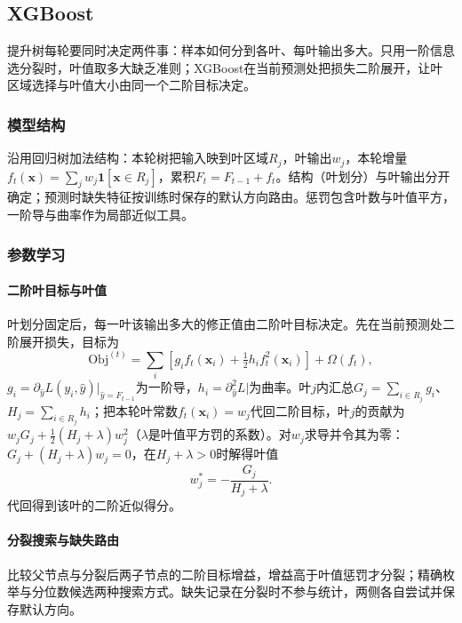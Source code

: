 \subsection{XGBoost}
\label{sec:ensemble-xgboost}

提升树每轮要同时决定两件事：样本如何分到各叶、每叶输出多大。只用一阶信息选分裂时，叶值取多大缺乏准则；XGBoost在当前预测处把损失二阶展开，让叶区域选择与叶值大小由同一个二阶目标决定。

\subsubsection{模型结构}
沿用回归树加法结构：本轮树把输入映到叶区域$R_j$，叶输出$w_j$，本轮增量$f_t(\bm x)=\sum_j w_j\mathbf1[\bm x\in R_j]$，累积$F_t=F_{t-1}+f_t$。结构（叶划分）与叶输出分开确定；预测时缺失特征按训练时保存的默认方向路由。惩罚包含叶数与叶值平方，一阶导与曲率作为局部近似工具。

\subsubsection{参数学习}

\paragraph{二阶叶目标与叶值}
叶划分固定后，每一叶该输出多大的修正值由二阶叶目标决定。先在当前预测处二阶展开损失，目标为
\begin{equation}
  \mathrm{Obj}^{(t)}=\sum_i[g_i f_t(\bm x_i)+\tfrac12h_i f_t^2(\bm x_i)]+\Omega(f_t),
  \label{eq:ensemble-xgb-objective}
\end{equation}
$g_i=\partial_{\hat y}L(y_i,\hat y)|_{\hat y=F_{t-1}}$为一阶导，$h_i=\partial_{\hat y}^2L|$为曲率。叶$j$内汇总$G_j=\sum_{i\in R_j}g_i$、$H_j=\sum_{i\in R_j}h_i$；把本轮叶常数$f_t(\bm x_i)=w_j$代回二阶目标，叶$j$的贡献为$w_jG_j+\frac12(H_j+\lambda)w_j^2$（$\lambda$是叶值平方罚的系数）。对$w_j$求导并令其为零：$G_j+(H_j+\lambda)w_j=0$，在$H_j+\lambda>0$时解得叶值
\begin{equation}
  w_j^*=-\frac{G_j}{H_j+\lambda}.
  \label{eq:ensemble-xgb-leaf}
\end{equation}
代回得到该叶的二阶近似得分。

\paragraph{分裂搜索与缺失路由}
比较父节点与分裂后两子节点的二阶目标增益，增益高于叶值惩罚才分裂；精确枚举与分位数候选两种搜索方式。缺失记录在分裂时不参与统计，两侧各自尝试并保存默认方向。

